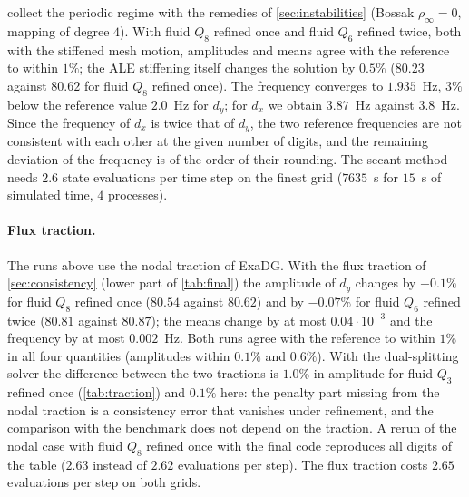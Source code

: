 \documentclass[11pt,a4paper]{article}
\theoremstyle{definition}
\theoremstyle{remark}
\begin{document}
 collect the periodic regime with the remedies of
\cref{sec:instabilities} (Bossak $\rho_\infty=0$, mapping of degree $4$). With fluid $Q_8$ refined
once and fluid $Q_6$ refined twice, both with the stiffened mesh motion, amplitudes and means agree
with the reference to within $1\%$; the ALE stiffening itself changes the solution by $0.5\%$
($80.23$ against $80.62$ for fluid $Q_8$ refined once). The frequency converges to $1.935$~Hz,
$3\%$ below the reference value $2.0$~Hz for $d_y$; for $d_x$ we obtain $3.87$~Hz against
$3.8$~Hz. Since the frequency of $d_x$ is twice that of $d_y$, the two reference frequencies are
not consistent with each other at the given number of digits, and the remaining deviation of the
frequency is of the order of their rounding. The secant method needs $2.6$ state evaluations per
time step on the finest grid ($7635$~s for $15$~s of simulated time, $4$ processes).

\paragraph{Flux traction.} The runs above use the nodal traction of ExaDG. With the flux traction
of \cref{sec:consistency} (lower part of \cref{tab:final}) the amplitude of $d_y$ changes by
$-0.1\%$ for fluid $Q_8$ refined once ($80.54$ against $80.62$) and by $-0.07\%$ for fluid $Q_6$
refined twice ($80.81$ against $80.87$); the means change by at most $0.04\cdot10^{-3}$ and the
frequency by at most $0.002$~Hz. Both runs agree with the reference to within $1\%$ in all four
quantities (amplitudes within $0.1\%$ and $0.6\%$). With the dual-splitting solver the difference
between the two tractions is $1.0\%$ in amplitude for fluid $Q_3$ refined once
(\cref{tab:traction}) and $0.1\%$ here: the penalty part missing from the nodal traction is a
consistency error that vanishes under refinement, and the comparison with the benchmark does not
depend on the traction. A rerun of the nodal case with fluid $Q_8$ refined once with the final code
reproduces all digits of the table ($2.63$ instead of $2.62$ evaluations per step). The flux
traction costs $2.65$ evaluations per step on both grids.
\end{document}
